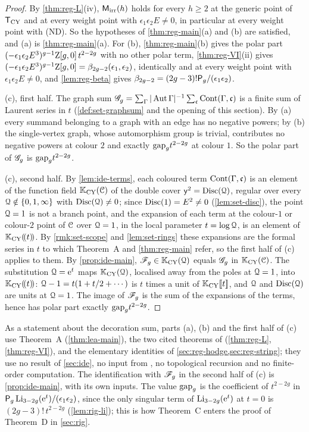 \begin{proof}
By \cref{thm:reg-L}(iv), $\mathsf{M}_{\mathrm{irr}}(h)$ holds for every $h\geq 2$ at the generic point of $\mathsf{T}_{\mathrm{CY}}$ and at every weight point with $\epsilon_1\epsilon_2E\neq 0$, in particular at every weight point with (ND). So the hypotheses of \cref{thm:reg-main}(a) and (b) are satisfied, and (a) is \cref{thm:reg-main}(a). For (b), \cref{thm:reg-main}(b) gives the polar part $(-\epsilon_1\epsilon_2E^3)^{g-1}\mathrm{Z}[g,0]\,t^{2-2g}$ with no other polar term, \cref{thm:reg-VI}(ii) gives $(-\epsilon_1\epsilon_2E^3)^{g-1}\mathrm{Z}[g,0]=\beta_{2g-2}(\epsilon_1,\epsilon_2)$, identically and at every weight point with $\epsilon_1\epsilon_2E\neq 0$, and \cref{lem:reg-beta} gives $\beta_{2g-2}=(2g-3)!\mathsf{P}_{g}/(\epsilon_1\epsilon_2)$.

(c), first half. The graph sum $\mathscr{G}_g=\sum_\Gamma|\operatorname{Aut}\Gamma|^{-1}\sum_{\mathfrak{c}}\mathrm{Cont}(\Gamma,\mathfrak{c})$ is a finite sum of Laurent series in $t$ (\cref{def:set-graphsum} and the opening of this section). By (a) every summand belonging to a graph with an edge has no negative powers; by (b) the single-vertex graph, whose automorphism group is trivial, contributes no negative powers at colour $2$ and exactly $\mathrm{gap}_g t^{2-2g}$ at colour $1$. So the polar part of $\mathscr{G}_g$ is $\mathrm{gap}_g t^{2-2g}$.

(c), second half. By \cref{lem:ide-terms}, each coloured term $\mathrm{Cont}(\Gamma,\mathfrak{c})$ is an element of the function field $\mathbb{K}_{\mathrm{CY}}(\mathcal{C})$ of the double cover $\mathsf{y}^2=\operatorname{Disc}(\mathcal{Q})$, regular over every $\mathcal{Q}\notin\{0,1,\infty\}$ with $\operatorname{Disc}(\mathcal{Q})\neq 0$; since $\operatorname{Disc}(1)=E^2\neq 0$ (\cref{lem:set-disc}), the point $\mathcal{Q}=1$ is not a branch point, and the expansion of each term at the colour-$1$ or colour-$2$ point of $\mathcal{C}$ over $\mathcal{Q}=1$, in the local parameter $t=\log\mathcal{Q}$, is an element of $\mathbb{K}_{\mathrm{CY}}(\!(t)\!)$. By \cref{rmk:set-scope} and \cref{lem:set-rings} these expansions are the formal series in $t$ to which Theorem~A and \cref{thm:reg-main} refer, so the first half of (c) applies to them. By \cref{prop:ide-main}, $\mathscr{F}_g\in\mathbb{K}_{\mathrm{CY}}(\mathcal{Q})$ equals $\mathscr{G}_g$ in $\mathbb{K}_{\mathrm{CY}}(\mathcal{C})$. The substitution $\mathcal{Q}=\mathrm{e}^{t}$ maps $\mathbb{K}_{\mathrm{CY}}(\mathcal{Q})$, localised away from the poles at $\mathcal{Q}=1$, into $\mathbb{K}_{\mathrm{CY}}(\!(t)\!)$: $\mathcal{Q}-1=t(1+t/2+\cdots)$ is $t$ times a unit of $\mathbb{K}_{\mathrm{CY}}[\![ t ]\!]$, and $\mathcal{Q}$ and $\operatorname{Disc}(\mathcal{Q})$ are units at $\mathcal{Q}=1$. The image of $\mathscr{F}_g$ is the sum of the expansions of the terms, hence has polar part exactly $\mathrm{gap}_g t^{2-2g}$.
\end{proof}

As a statement about the decoration sum, parts (a), (b) and the first half of (c) use Theorem~A (\cref{thm:lea-main}), the two cited theorems of \cite{LP2} (\cref{thm:reg-L}, \cref{thm:reg-VI}), and the elementary identities of \cref{sec:reg-hodge,sec:reg-string}; they use no result of \cref{sec:ide}, no input from \cite{BS}, no topological recursion and no finite-order computation. The identification with $\mathscr{F}_g$ in the second half of (c) is \cref{prop:ide-main}, with its own inputs. The value $\mathrm{gap}_g$ is the coefficient of $t^{2-2g}$ in $\mathsf{P}_{g}\operatorname{Li}_{3-2g}(\mathrm{e}^{t})/(\epsilon_1\epsilon_2)$, since the only singular term of $\operatorname{Li}_{3-2g}(\mathrm{e}^{t})$ at $t=0$ is $(2g-3)!\,t^{2-2g}$ (\cref{lem:rig-li}); this is how Theorem~C enters the proof of Theorem~D in \cref{sec:rig}.

